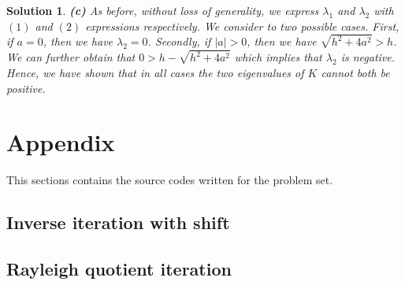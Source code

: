 \documentclass{article} %
\theoremstyle{quest}
\newtheorem*{solution}{Solution}
\begin{document}
\begin{solution}
\bigskip

\textbf{(c)} 
As before, without loss of
generality, we express $\lambda_1$ and $\lambda_2$ with $(1)$ and $(2)$ expressions respectively.
We consider to two possible cases. First, if $a = 0$, then we have $\lambda_2 = 0$.
Secondly, if $|a| > 0$, then we have $\sqrt{h^2 + 4a^2} > h$. We can further obtain that
$0 > h - \sqrt{h^2 + 4a^2}$ which implies that $\lambda_2$ is negative. Hence, we have shown that in all
cases the two eigenvalues of $K$ cannot both be positive.
\end{solution}

\pagebreak

\section{Appendix}
This sections contains the source codes written for the problem set.
\subsection{Inverse iteration with shift}

\subsection{Rayleigh quotient iteration}

\end{document}
